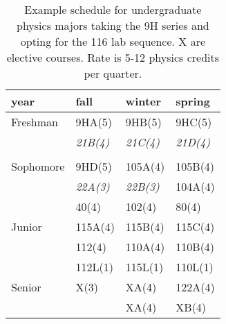 \documentclass[12pt]{article}
\begin{document}
\begin{table}
\caption{Example schedule for undergraduate physics majors taking the 9H series and opting for the 116 lab sequence.  X are elective courses.  Rate is 5-12 physics credits per quarter.}
\label{tbl:proposed-honors}
\begin{center}
\begin{tabular}{|l|l|l|l|}
\hline
year      & fall    & winter & spring \\
\hline
Freshman  & 9HA(5)       & 9HB(5)        & 9HC(5) \\
          & {\it 21B(4)} & {\it 21C(4)}  & {\it 21D(4)}\\
          &              &               & \\
\hline
Sophomore & 9HD(5)       & 105A(4)      & 105B(4) \\
          & {\it 22A(3)} & {\it 22B(3)} & 104A(4) \\
          & 40(4)        & 102(4)       & 80(4)  \\
\hline
Junior    & 115A(4) & 115B(4)  & 115C(4)\\
          & 112(4)  & 110A(4)  & 110B(4)\\
		  & 112L(1) & 115L(1)  & 110L(1)\\
\hline
Senior    & X(3)    & XA(4)  & 122A(4) \\
          &         & XA(4)  & XB(4) \\

\hline  
\end{tabular}
\end{center}
\end{table}
\end{document}
